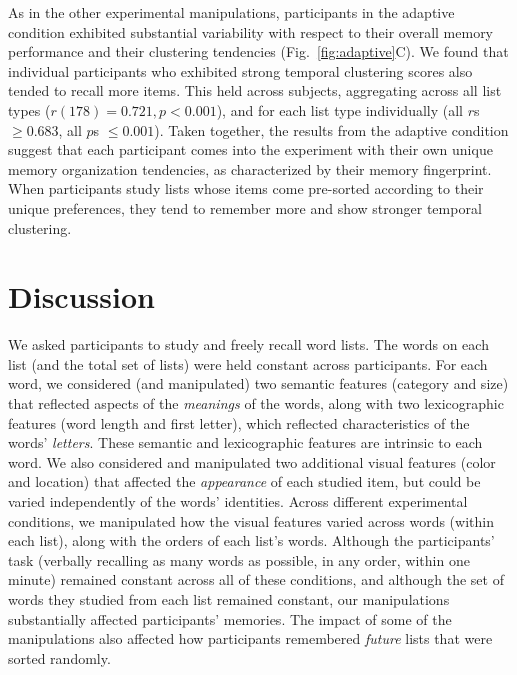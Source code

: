\documentclass[11pt]{article}
\begin{document}
As in the other experimental manipulations, participants in the adaptive
condition exhibited substantial variability with respect to their overall
memory performance and their clustering tendencies (Fig.~\ref{fig:adaptive}C).
We found that individual participants who exhibited strong temporal clustering
scores also tended to recall more items. This held across subjects, aggregating
across all list types ($r(178) = 0.721, p < 0.001$), and for each list type
individually (all $r$s $\geq 0.683$, all $p$s $\leq 0.001$). Taken together,
the results from the adaptive condition suggest that each participant comes
into the experiment with their own unique memory organization tendencies, as
characterized by their memory fingerprint. When participants study lists whose
items come pre-sorted according to their unique preferences, they tend to remember
more and show stronger temporal clustering.

\section*{Discussion}


We asked participants to study and freely recall word lists. The words on each
list (and the total set of lists) were held constant across participants. For
each word, we considered (and manipulated) two semantic features (category and
size) that reflected aspects of the \textit{meanings} of the words, along with
two lexicographic features (word length and first letter), which reflected
characteristics of the words' \textit{letters}. These semantic and
lexicographic features are intrinsic to each word. We also considered and
manipulated two additional visual features (color and location) that affected
the \textit{appearance} of each studied item, but could be varied independently
of the words' identities. Across different experimental conditions, we
manipulated how the visual features varied across words (within each list),
along with the orders of each list's words. Although the participants' task
(verbally recalling as many words as possible, in any order, within one minute)
remained constant across all of these conditions, and although the set of words
they studied from each list remained constant, our manipulations substantially
affected participants' memories. The impact of some of the manipulations also
affected how participants remembered \textit{future} lists that were sorted
randomly.

\end{document}
